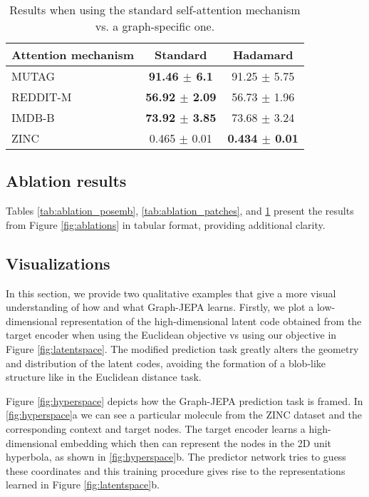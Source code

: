 \documentclass{article} \usepackage{iclr2024_conference,times}
\begin{document}
\begin{table}
    \centering
    \caption{Results when using the standard self-attention mechanism vs. a graph-specific one.}
    \begin{tabular}{|l|c|c|}
    \hline
    Attention mechanism & Standard & Hadamard \\ \hline
    MUTAG    & \textbf{91.46 $\pm$ 6.1}  & 91.25 $\pm$ 5.75\\ \hline
    REDDIT-M & \textbf{56.92 $\pm$ 2.09} & 56.73 $\pm$ 1.96\\ \hline
    IMDB-B   & \textbf{73.92 $\pm$ 3.85} & 73.68 $\pm$ 3.24\\ \hline
    ZINC     & 0.465 $\pm$ 0.01 & \textbf{0.434 $\pm$ 0.01}\\ \hline
    \end{tabular}
    \label{tab:ablation_attn}
\end{table}

\subsection{Ablation results} \label{app:ablation-tab}
Tables \ref{tab:ablation_posemb}, \ref{tab:ablation_patches}, and \ref{tab:ablation_attn} present the results from Figure \ref{fig:ablations} in tabular format, providing additional clarity.

\subsection{Visualizations} \label{app:latent-fig}
In this section, we provide two qualitative examples that give a more visual understanding of how and what Graph-JEPA learns. Firstly, we plot a low-dimensional representation of the high-dimensional latent code obtained from the target encoder when using the Euclidean objective vs using our objective in Figure \ref{fig:latentspace}. The modified prediction task greatly alters the geometry and distribution of the latent codes, avoiding the formation of a blob-like structure like in the Euclidean distance task. 

Figure \ref{fig:hyperspace} depicts how the Graph-JEPA prediction task is framed. In \ref{fig:hyperspace}a we can see a particular molecule from the ZINC dataset and the corresponding context and target nodes. The target encoder learns a high-dimensional embedding which then can represent the nodes in the 2D unit hyperbola, as shown in \ref{fig:hyperspace}b. The predictor network tries to guess these coordinates and this training procedure gives rise to the representations learned in Figure \ref{fig:latentspace}b.
\end{document}
